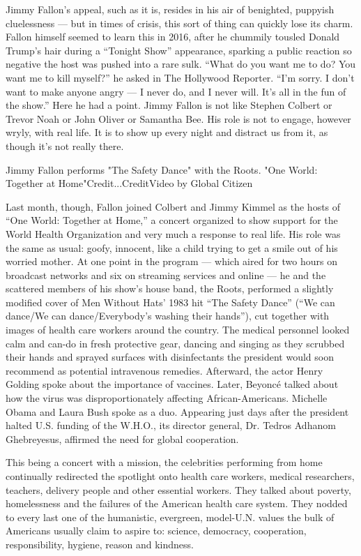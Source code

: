 Jimmy Fallon's appeal, such as it is, resides in his air of benighted,
puppyish cluelessness --- but in times of crisis, this sort of thing can
quickly lose its charm. Fallon himself seemed to learn this in 2016,
after he chummily tousled Donald Trump's hair during a ``Tonight Show''
appearance, sparking a public reaction so negative the host was pushed
into a rare sulk. ``What do you want me to do? You want me to kill
myself?'' he asked in The Hollywood Reporter. ``I'm sorry. I don't want
to make anyone angry --- I never do, and I never will. It's all in the
fun of the show.'' Here he had a point. Jimmy Fallon is not like Stephen
Colbert or Trevor Noah or John Oliver or Samantha Bee. His role is not
to engage, however wryly, with real life. It is to show up every night
and distract us from it, as though it's not really there.

Jimmy Fallon performs "The Safety Dance" with the Roots. \textbar{} "One
World: Together at Home"Credit...CreditVideo by Global Citizen

Last month, though, Fallon joined Colbert and Jimmy Kimmel as the hosts
of ``One World: Together at Home,'' a concert organized to show support
for the World Health Organization and very much a response to real life.
His role was the same as usual: goofy, innocent, like a child trying to
get a smile out of his worried mother. At one point in the program ---
which aired for two hours on broadcast networks and six on streaming
services and online --- he and the scattered members of his show's house
band, the Roots, performed a slightly modified cover of Men Without
Hats' 1983 hit ``The Safety Dance'' (``We can dance/We can
dance/Everybody's washing their hands''), cut together with images of
health care workers around the country. The medical personnel looked
calm and can-do in fresh protective gear, dancing and singing as they
scrubbed their hands and sprayed surfaces with disinfectants the
president would soon recommend as potential intravenous remedies.
Afterward, the actor Henry Golding spoke about the importance of
vaccines. Later, Beyoncé talked about how the virus was
disproportionately affecting African-Americans. Michelle Obama and Laura
Bush spoke as a duo. Appearing just days after the president halted U.S.
funding of the W.H.O., its director general, Dr. Tedros Adhanom
Ghebreyesus, affirmed the need for global cooperation.

This being a concert with a mission, the celebrities performing from
home continually redirected the spotlight onto health care workers,
medical researchers, teachers, delivery people and other essential
workers. They talked about poverty, homelessness and the failures of the
American health care system. They nodded to every last one of the
humanistic, evergreen, model-U.N. values the bulk of Americans usually
claim to aspire to: science, democracy, cooperation, responsibility,
hygiene, reason and kindness.


